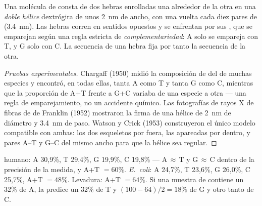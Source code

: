 \begin{proposition}\label{prop:g10:universal-dna:helix}
Una molécula de  consta de dos hebras enrolladas una alrededor de la
otra en una \emph{doble hélice} dextrógira de unos
\qty{2}{nm} de ancho, con una vuelta cada diez pares de 
(\qty{3.4}{nm}). Las hebras corren en sentidos opuestos y se enfrentan
por sus , que se emparejan según una regla estricta de
\emph{complementariedad}: A solo se empareja
con T, y G solo con C. La secuencia de una hebra fija por tanto la
secuencia de la otra.
\end{proposition}
\begin{proof}[Pruebas experimentales]
Chargaff (1950) midió la composición de  del  de muchas
especies y encontró, en todas ellas, tanta A como T y tanta G como C,
mientras que la proporción de A+T frente a G+C variaba de una especie a
otra --- una regla de emparejamiento, no un accidente químico. Las
fotografías de rayos X de fibras de  de Franklin (1952) mostraron la
firma de una hélice de \qty{2}{nm} de diámetro y \qty{3.4}{nm} de paso.
Watson y Crick (1953) construyeron el único modelo compatible con
ambas: los dos esqueletos por fuera, las  apareadas por dentro, y
pares A--T y G--C del mismo ancho para que la hélice sea regular.
\end{proof}

\begin{example}\label{ex:g10:universal-dna:chargaff}
 humano: A 30,9\%, T 29,4\%, G 19,9\%, C 19,8\% --- A$\,\approx\,$T
y G$\,\approx\,$C dentro de la precisión de la medida, y A+T $= 60\%$.
\emph{E.~coli}: A 24,7\%, T 23,6\%, G 26,0\%, C 25,7\%, A+T $= 48\%$.
Levadura: A+T $= 64\%$. Si una muestra de  contiene un 32\% de A, la
 predice un 32\% de T y $(100 - 64)/2 = 18\%$ de G y
otro tanto de C.
\end{example}

